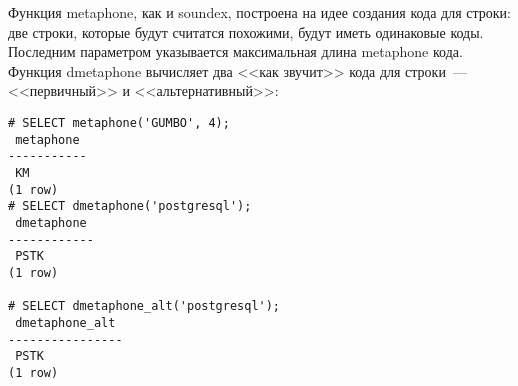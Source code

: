 Функция metaphone, как и soundex, построена на идее создания кода для строки: две строки, которые будут считатся похожими, будут иметь одинаковые коды. Последним параметром указывается максимальная длина metaphone кода. Функция dmetaphone вычисляет два <<как звучит>> кода для строки~--- <<первичный>> и <<альтернативный>>:

\begin{lstlisting}[label=lst:ext_fuzzystrmatch3,caption=metaphone]
# SELECT metaphone('GUMBO', 4);
 metaphone
-----------
 KM
(1 row)
# SELECT dmetaphone('postgresql');
 dmetaphone 
------------
 PSTK
(1 row)

# SELECT dmetaphone_alt('postgresql');
 dmetaphone_alt 
----------------
 PSTK
(1 row)
\end{lstlisting}

